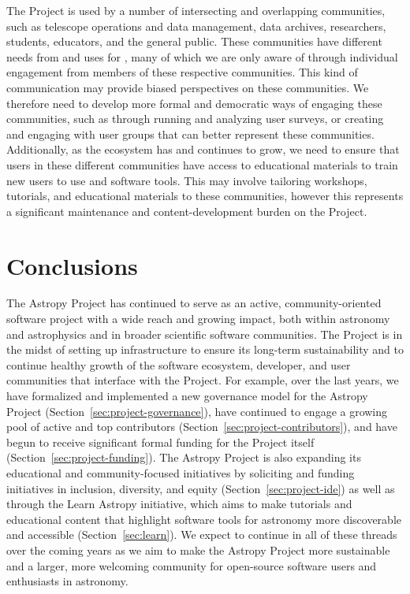\documentclass[modern]{aastex631}
\begin{document}
\begin{description}
  The \astropy Project is used by a number of intersecting and overlapping
  communities, such as telescope operations and data management, data archives,
  researchers, students, educators, and the general public.
  These communities have different needs from and uses for \astropy, many of
  which we are only aware of through individual engagement from members of these
  respective communities.
  This kind of communication may provide biased perspectives on these
  communities.
  We therefore need to develop more formal and democratic ways of engaging these
  communities, such as through running and analyzing user surveys, or
  creating and engaging with user groups that can better represent these
  communities.
  Additionally, as the \astropy ecosystem has and continues to grow, we need to
  ensure that users in these different communities have access to educational
  materials to train new users to use \astropy and \python software tools.
  This may involve tailoring workshops, tutorials, and educational materials to
  these communities, however this represents a significant maintenance and
  content-development burden on the Project.
\end{description}


\section{Conclusions}
\label{sec:conclusions}

The Astropy Project has continued to serve as an active, community-oriented
software project with a wide reach and growing impact, both within astronomy and
astrophysics and in broader scientific software communities.
The Project is in the midst of setting up infrastructure to ensure its long-term
sustainability and to continue healthy growth of the software ecosystem,
developer, and user communities that interface with the Project.
For example, over the last years, we have formalized and implemented a new
governance model for the Astropy Project (Section~\ref{sec:project-governance}),
have continued to engage a growing pool of active and top contributors
(Section~\ref{sec:project-contributors}), and have begun to receive significant
formal funding for the Project itself (Section~\ref{sec:project-funding}).
The Astropy Project is also expanding its educational and community-focused
initiatives by soliciting and funding initiatives in inclusion, diversity, and
equity (Section~\ref{sec:project-ide}) as well as through the Learn Astropy initiative,
which aims to make tutorials and educational content that highlight software
tools for astronomy more discoverable and accessible (Section~\ref{sec:learn}).
We expect to continue in all of these threads over the coming years as we aim to
make the Astropy Project more sustainable and a larger, more welcoming community
for open-source software users and enthusiasts in astronomy.
\end{document}
